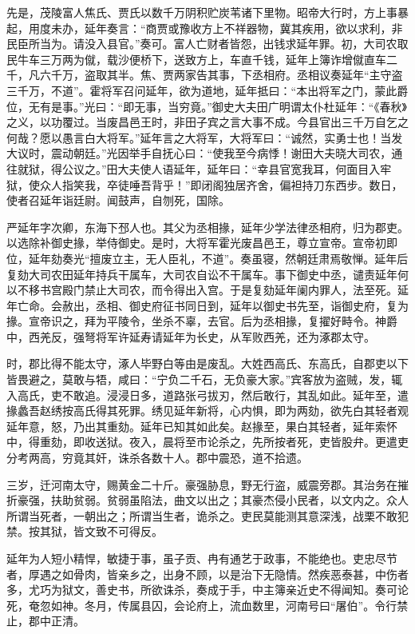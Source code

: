 \documentclass[]{article}
\begin{document}
先是，茂陵富人焦氏、贾氏以数千万阴积贮炭苇诸下里物。昭帝大行时，方上事暴起，用度未办，延年奏言：``商贾或豫收方上不祥器物，冀其疾用，欲以求利，非民臣所当为。请没入县官。''奏可。富人亡财者皆怨，出钱求延年罪。初，大司农取民牛车三万两为僦，载沙便桥下，送致方上，车直千钱，延年上簿诈增僦直车二千，凡六千万，盗取其半。焦、贾两家告其事，下丞相府。丞相议奏延年``主守盗三千万，不道''。霍将军召问延年，欲为道地，延年抵曰：``本出将军之门，蒙此爵位，无有是事。''光曰：``即无事，当穷竟。''御史大夫田广明谓太仆杜延年：``《春秋》之义，以功覆过。当废昌邑王时，非田子宾之言大事不成。今县官出三千万自乞之何哉？愿以愚言白大将军。''延年言之大将军，大将军曰：``诚然，实勇士也！当发大议时，震动朝廷。''光因举手自抚心曰：``使我至今病悸！谢田大夫晓大司农，通往就狱，得公议之。''田大夫使人语延年，延年曰：``幸县官宽我耳，何面目入牢狱，使众人指笑我，卒徒唾吾背乎！''即闭阁独居齐舍，偏袒持刀东西步。数日，使者召延年诣廷尉。闻鼓声，自刎死，国除。

严延年字次卿，东海下邳人也。其父为丞相掾，延年少学法律丞相府，归为郡吏。以选除补御史掾，举侍御史。是时，大将军霍光废昌邑王，尊立宣帝。宣帝初即位，延年劾奏光``擅废立主，无人臣礼，不道''。奏虽寝，然朝廷肃焉敬惮。延年后复劾大司农田延年持兵干属车，大司农自讼不干属车。事下御史中丞，谴责延年何以不移书宫殿门禁止大司农，而令得出入宫。于是复劾延年阑内罪人，法至死。延年亡命。会赦出，丞相、御史府征书同日到，延年以御史书先至，诣御史府，复为掾。宣帝识之，拜为平陵令，坐杀不辜，去官。后为丞相掾，复擢好畤令。神爵中，西羌反，强弩将军许延寿请延年为长史，从军败西羌，还为涿郡太守。

时，郡比得不能太守，涿人毕野白等由是废乱。大姓西高氏、东高氏，自郡吏以下皆畏避之，莫敢与牾，咸曰：``宁负二千石，无负豪大家。''宾客放为盗贼，发，辄入高氏，吏不敢追。浸浸日多，道路张弓拔刃，然后敢行，其乱如此。延年至，遣掾蠡吾赵绣按高氏得其死罪。绣见延年新将，心内惧，即为两劾，欲先白其轻者观延年意，怒，乃出其重劾。延年已知其如此矣。赵掾至，果白其轻者，延年索怀中，得重劾，即收送狱。夜入，晨将至市论杀之，先所按者死，吏皆股弁。更遣吏分考两高，穷竟其奸，诛杀各数十人。郡中震恐，道不拾遗。

三岁，迁河南太守，赐黄金二十斤。豪强胁息，野无行盗，威震旁郡。其治务在摧折豪强，扶助贫弱。贫弱虽陷法，曲文以出之；其豪杰侵小民者，以文内之。众人所谓当死者，一朝出之；所谓当生者，诡杀之。吏民莫能测其意深浅，战栗不敢犯禁。按其狱，皆文致不可得反。

延年为人短小精悍，敏捷于事，虽子贡、冉有通艺于政事，不能绝也。吏忠尽节者，厚遇之如骨肉，皆亲乡之，出身不顾，以是治下无隐情。然疾恶泰甚，中伤者多，尤巧为狱文，善史书，所欲诛杀，奏成于手，中主簿亲近史不得闻知。奏可论死，奄忽如神。冬月，传属县囚，会论府上，流血数里，河南号曰``屠伯''。令行禁止，郡中正清。
\end{document}
